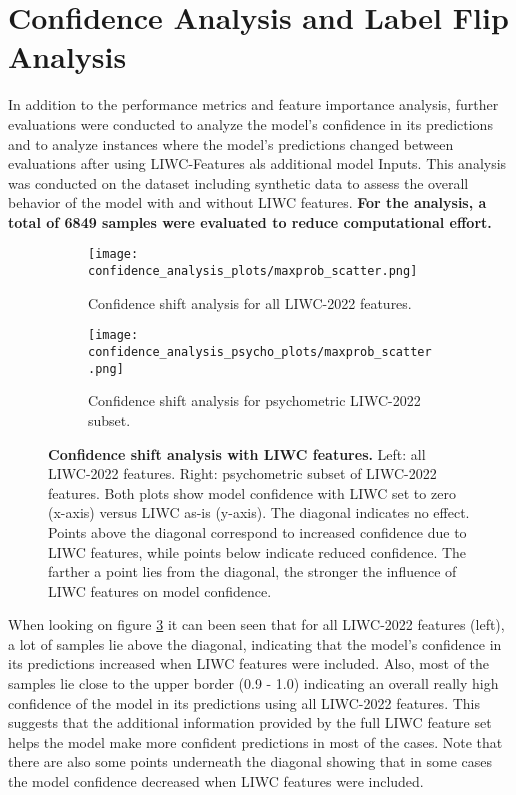 \section{Confidence Analysis and Label Flip Analysis} \label{sec:confidence_and_label_flip_analysis}

In addition to the performance metrics and feature importance analysis, further evaluations were conducted to analyze the model's confidence in its predictions and to analyze instances where the model's predictions changed between evaluations after using LIWC-Features als additional model Inputs. This analysis was conducted on the dataset including synthetic data to assess the overall behavior of the model with and without LIWC features. \textbf{For the analysis, a total of 6849 samples were evaluated to reduce computational effort.}

\begin{figure}[H]
  \centering
  
  \begin{subfigure}[t]{0.49\textwidth}
    \centering
    \texttt{[image: confidence\_analysis\_plots/maxprob\_scatter.png]}
    \caption{Confidence shift analysis for all LIWC-2022 features.}
    \label{fig:confshift_all}
  \end{subfigure}\hfill
  \begin{subfigure}[t]{0.49\textwidth}
    \centering
    \texttt{[image: confidence\_analysis\_psycho\_plots/maxprob\_scatter.png]}
    \caption{Confidence shift analysis for psychometric LIWC-2022 subset.}
    \label{fig:confshift_psycho}
  \end{subfigure}

  \caption[Confidence shift analysis with LIWC features.]{\textbf{Confidence shift analysis with LIWC features.} 
  Left: all LIWC-2022 features. Right: psychometric subset of LIWC-2022 features. 
  Both plots show model confidence with LIWC set to zero (x-axis) versus LIWC as-is (y-axis). 
  The diagonal indicates no effect. 
  Points above the diagonal correspond to increased confidence due to LIWC features, while points below indicate reduced confidence. 
  The farther a point lies from the diagonal, the stronger the influence of LIWC features on model confidence. }
  \label{fig:confidence_shift}

\end{figure}


When looking on figure \ref{fig:confidence_shift} it can been seen that for all LIWC-2022 features (left), a lot of samples lie above the diagonal, indicating that the model's confidence in its predictions increased when LIWC features were included. Also, most of the samples lie close to the upper border (0.9 - 1.0) indicating an overall really high confidence of the model in its predictions using all LIWC-2022 features.
This suggests that the additional information provided by the full LIWC feature set helps the model make more confident predictions in most of the cases. Note that there are also some points underneath the diagonal showing that in some cases the model confidence decreased when LIWC features were included. 

